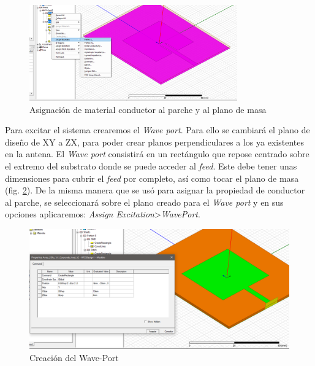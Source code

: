 \\
\begin{figure}[h]
    \centering
        \includegraphics[width=0.8\textwidth]{archivos/desarrollo/5}
        \caption{Asignación de material conductor al parche y al plano de masa}
        \label{fig:perfecte}
\end{figure}
\par Para excitar el sistema crearemos el \textit{Wave port}. Para ello se cambiará el plano de diseño de XY a ZX, para poder crear planos perpendiculares a los ya existentes en la antena. El \textit{Wave port} consistirá en un rectángulo que repose centrado sobre el extremo del substrato donde se puede acceder al \textit{feed}. Este debe tener unas dimensiones para cubrir el \textit{feed} por completo, así como tocar el plano de masa (fig. \ref{fig:waveport}). De la misma manera que se usó para asignar la propiedad de conductor al parche, se seleccionará sobre el plano creado para el \textit{Wave port} y en sus opciones aplicaremos: \textit{Assign Excitation}>\textit{WavePort}. 
\\

\begin{figure}[p]
    \centering
        \includegraphics[width=\textwidth]{archivos/desarrollo/6}
        \caption{Creación del Wave-Port}
        \label{fig:waveport}
\end{figure}


